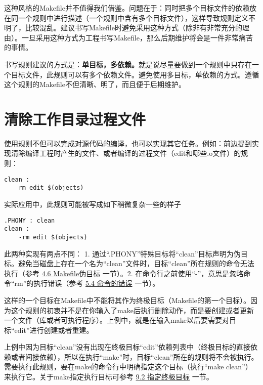 这种风格的Makefile并不值得我们借鉴。问题在于：同时把多个目标文件的依赖放在同一个规则中进行描述（一个规则中含有多个目标文件），这样导致规则定义不明了，比较混乱。建议书写Makefile时避免采用这种方式（除非有非常充分的理由）。一旦采用这种方式为工程书写Makefile，那么后期维护将会是一件非常痛苦的事情。

书写规则建议的方式是：\textbf{单目标，多依赖。}就是说尽量要做到一个规则中只存在一个目标文件，此规则可以有多个依赖文件。避免使用多目标，单依赖的方式。遵循这个规则的Makefile不但清晰、明了，而且便于后期维护。

\section{清除工作目录过程文件}

使用规则不但可以完成对源代码的编译，也可以实现其它任务。例如：前边提到实现清除编译工程时产生的文件、或者编译的过程文件（edit和哪些.o文件）的规则：
\begin{Verbatim}[]
clean :
    rm edit $(objects)
\end{Verbatim}
实际应用中，此规则可能被写成如下稍微复杂一些的样子
\begin{Verbatim}[]
.PHONY : clean
clean :
    -rm edit $(objects)
\end{Verbatim}

此两种实现有两点不同： 1. 通过“.PHONY”特殊目标将“clean”目标声明为伪目标。避免当磁盘上存在一个名为“clean”文件时，目标“clean”所在规则的命令无法执行（参考 \hyperref[sec:4.6]{4.6 Makefile伪目标} 一节）。2. 在命令行之前使用“-”，意思是忽略命令“rm”的执行错误（参考 \hyperref[sec:5.4]{5.4 命令的错误} 一节）。

这样的一个目标在Makefile中不能将其作为终极目标（Makefile的第一个目标）。因为这个规则的初衷并不是在你输入了make后执行删除动作，而是要创建或者更新一个文件（库或者可执行程序）。上例中，就是在输入make以后要需要对目标“edit”进行创建或者重建。

上例中因为目标“clean”没有出现在终极目标“edit”依赖列表中（终极目标的直接依赖或者间接依赖），所以在执行“make”时，目标“clean”所在的规则将不会被执行。需要执行此规则，要在make的命令行中明确指定这个目标（执行“make clean”）来执行它。关于make指定执行目标可参考 \hyperref[sec:9.2]{9.2 指定终极目标} 一节。
